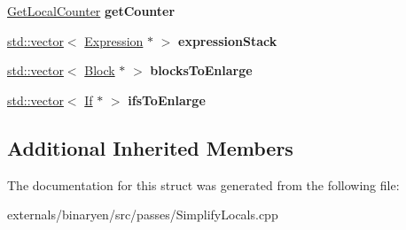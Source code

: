 \begin{DoxyCompactItemize}
\item 
\mbox{\label{structwasm_1_1_simplify_locals_a9b1f8248315849b847671734c7f00c45}} 
\mbox{\hyperlink{structwasm_1_1_get_local_counter}{Get\+Local\+Counter}} {\bfseries get\+Counter}
\item 
\mbox{\label{structwasm_1_1_simplify_locals_a12f6c7039d579fe2d1f09ea1c4df3189}} 
\mbox{\hyperlink{classstd_1_1vector}{std\+::vector}}$<$ \mbox{\hyperlink{classwasm_1_1_expression}{Expression}} $\ast$ $>$ {\bfseries expression\+Stack}
\item 
\mbox{\label{structwasm_1_1_simplify_locals_a3611c8d74817454d53697c0e48534b4d}} 
\mbox{\hyperlink{classstd_1_1vector}{std\+::vector}}$<$ \mbox{\hyperlink{classwasm_1_1_block}{Block}} $\ast$ $>$ {\bfseries blocks\+To\+Enlarge}
\item 
\mbox{\label{structwasm_1_1_simplify_locals_a58e51efec4264f556da9e16e72913efd}} 
\mbox{\hyperlink{classstd_1_1vector}{std\+::vector}}$<$ \mbox{\hyperlink{classwasm_1_1_if}{If}} $\ast$ $>$ {\bfseries ifs\+To\+Enlarge}
\end{DoxyCompactItemize}
\subsection*{Additional Inherited Members}


The documentation for this struct was generated from the following file\+:\begin{DoxyCompactItemize}
\item 
externals/binaryen/src/passes/Simplify\+Locals.\+cpp\end{DoxyCompactItemize}
